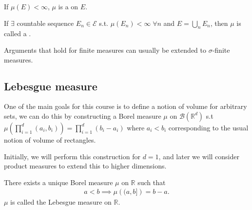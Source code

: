 \begin{definition}
	If $\mu(E) < \infty$, $\mu$ is a  on $E$.
\end{definition}

\begin{definition}
	If $\exists$ countable sequence $E_n \in \mathcal{E}$ s.t. $\mu(E_n) < \infty \; \forall n$ and $E = \bigcup_n E_n$, then $\mu$ is called a .
\end{definition}

\begin{remark}
	Arguments that hold for finite measures can usually be extended to $\sigma$-finite measures.
\end{remark}

\subsection{Lebesgue measure}
One of the main goals for this course is to define a notion of volume for arbitrary sets, we can do this by constructing a Borel measure $\mu$ on $\mathcal{B}(\mathbb{R}^d)$ s.t $\mu \left( \prod_{i=1}^d (a_i, b_i) \right) = \prod_{i=1}^d (b_i - a_i)$ where $a_i < b_i$ corresponding to the usual notion of volume of rectangles.

Initially, we will perform this construction for $d = 1$, and later we will consider product measures to extend this to higher dimensions.

\begin{theorem}
	There exists a unique Borel measure $\mu$ on $\mathbb R$ such that
	\begin{align*}
		a < b \implies \mu \left( (a,b] \right) = b - a. \tag{$\dagger$}
	\end{align*}
	$\mu$ is called the Lebesgue measure on $\mathbb{R}$.
\end{theorem}

